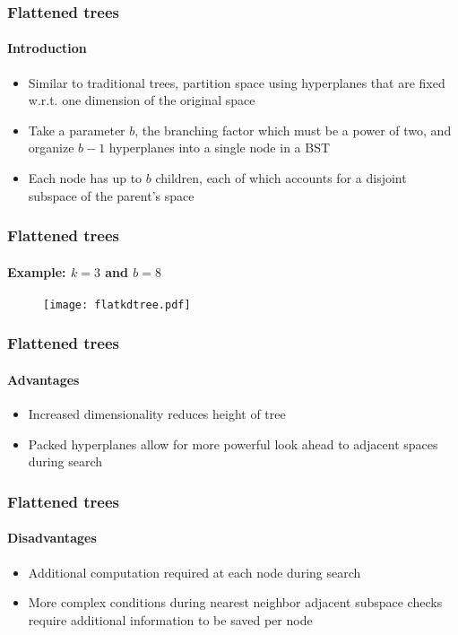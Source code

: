 
\begin{frame}
  \frametitle{Flattened \kd trees}
  \framesubtitle{Introduction}

  \begin{itemize}
    \item Similar to traditional \kd trees, partition space using hyperplanes that are 
      fixed w.r.t. one dimension of the original space
    \item Take a parameter $b$, the branching factor which must be a power of two, and
      organize $b-1$ hyperplanes into a single node in a BST
    \item Each node has up to $b$ children, each of which accounts for a disjoint subspace 
      of the parent's space
  \end{itemize}

\end{frame}

\begin{frame}
  \frametitle{Flattened \kd trees}
  \framesubtitle{Example: $k=3$ and $b=8$}
  
  \begin{figure}
    \centering
    \texttt{[image: flatkdtree.pdf]}
  \end{figure}

\end{frame}

\begin{frame}
  \frametitle{Flattened \kd trees}
  \framesubtitle{Advantages}

  \begin{itemize}
    \item Increased dimensionality reduces height of tree
    \item Packed hyperplanes allow for more powerful look ahead to adjacent
      spaces during search
  \end{itemize}

\end{frame}

\begin{frame}
  \frametitle{Flattened \kd trees}
  \framesubtitle{Disadvantages}

  \begin{itemize}
    \item Additional computation required at each node during search
    \item More complex conditions during nearest neighbor adjacent subspace
      checks require additional information to be saved per node
  \end{itemize}

\end{frame}

